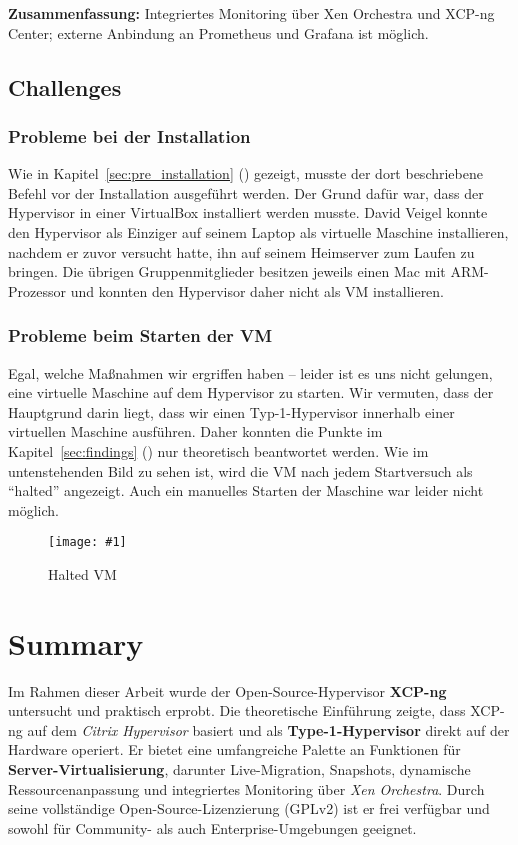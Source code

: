 \documentclass[BMR,Seminar,ngerman,IEEE]{twbook}
\newcommand{\screenshotH}[3]{%
  \begin{figure}[H]
    \centering
    \texttt{[image: \#1]}%
    \caption{#2}%
    \label{fig:#3}%
  \end{figure}%
}
\begin{document}
\noindent\textbf{Zusammenfassung:}  
Integriertes Monitoring über Xen Orchestra und XCP-ng Center; externe Anbindung an Prometheus und Grafana ist möglich.

\section{Challenges}

\subsection{Probleme bei der Installation}
Wie in Kapitel~\ref{sec:pre_installation} () gezeigt, musste der dort beschriebene Befehl vor der Installation ausgeführt werden. Der Grund dafür war, dass der Hypervisor in einer VirtualBox installiert werden musste. David Veigel konnte den Hypervisor als Einziger auf seinem Laptop als virtuelle Maschine installieren, nachdem er zuvor versucht hatte, ihn auf seinem Heimserver zum Laufen zu bringen. Die übrigen Gruppenmitglieder besitzen jeweils einen Mac mit ARM-Prozessor und konnten den Hypervisor daher nicht als VM installieren.

\subsection{Probleme beim Starten der VM}
Egal, welche Maßnahmen wir ergriffen haben – leider ist es uns nicht gelungen, eine virtuelle Maschine auf dem Hypervisor zu starten. Wir vermuten, dass der Hauptgrund darin liegt, dass wir einen Typ-1-Hypervisor innerhalb einer virtuellen Maschine ausführen. Daher konnten die Punkte im Kapitel~\ref{sec:findings} () nur theoretisch beantwortet werden. Wie im untenstehenden Bild zu sehen ist, wird die VM nach jedem Startversuch als \enquote{halted} angezeigt. Auch ein manuelles Starten der Maschine war leider nicht möglich.
\screenshotH{halted.png}{Halted VM}{halted}
\FloatBarrier

\chapter{Summary}
Im Rahmen dieser Arbeit wurde der Open-Source-Hypervisor \textbf{XCP-ng} untersucht und praktisch erprobt.  
Die theoretische Einführung zeigte, dass XCP-ng auf dem \textit{Citrix Hypervisor} basiert und als \textbf{Type-1-Hypervisor} direkt auf der Hardware operiert. Er bietet eine umfangreiche Palette an Funktionen für \textbf{Server-Virtualisierung}, darunter Live-Migration, Snapshots, dynamische Ressourcenanpassung und integriertes Monitoring über \textit{Xen Orchestra}. Durch seine vollständige Open-Source-Lizenzierung (GPLv2) ist er frei verfügbar und sowohl für Community- als auch Enterprise-Umgebungen geeignet.
\end{document}
